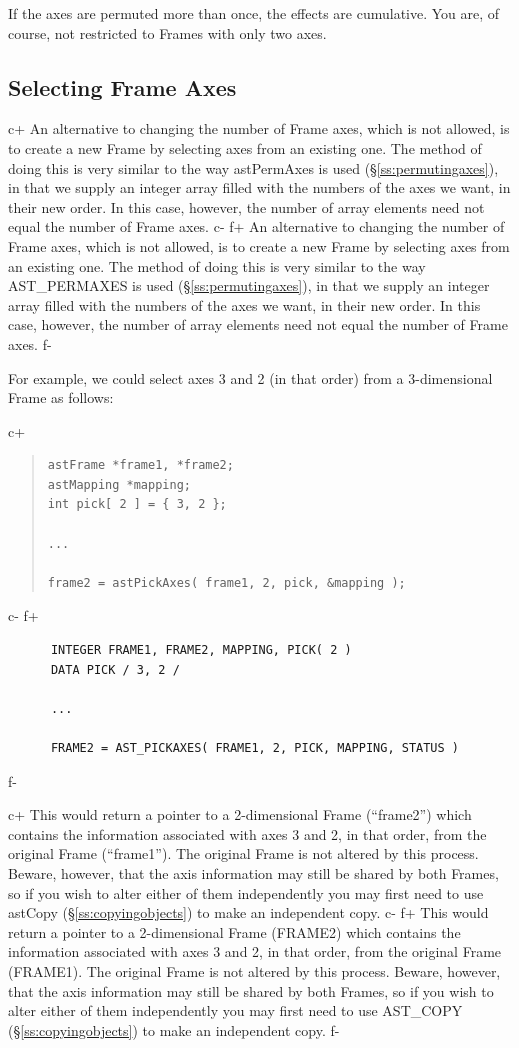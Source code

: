 \documentclass[twoside,11pt]{article}
\newcommand{\secref}[1]{\S\ref{#1}}
\newcommand{\secref}[1]{\ref{#1}}
\begin{document}
If the axes are permuted more than once, the effects are cumulative.
You are, of course, not restricted to Frames with only two axes.

\subsection{Selecting Frame Axes}

c+
An alternative to changing the number of Frame axes, which is not
allowed, is to create a new Frame by selecting axes from an existing
one. The method of doing this is very similar to the way astPermAxes
is used (\secref{ss:permutingaxes}), in that we supply an integer
array filled with the numbers of the axes we want, in their new
order. In this case, however, the number of array elements need not
equal the number of Frame axes.
c-
f+
An alternative to changing the number of Frame axes, which is not
allowed, is to create a new Frame by selecting axes from an existing
one. The method of doing this is very similar to the way AST\_PERMAXES
is used (\secref{ss:permutingaxes}), in that we supply an integer
array filled with the numbers of the axes we want, in their new
order. In this case, however, the number of array elements need not
equal the number of Frame axes.
f-

For example, we could select axes 3 and 2 (in that order) from a
3-dimensional Frame as follows:

c+
\begin{quote}
\small
\begin{verbatim}
astFrame *frame1, *frame2;
astMapping *mapping;
int pick[ 2 ] = { 3, 2 };

...

frame2 = astPickAxes( frame1, 2, pick, &mapping );
\end{verbatim}
\normalsize
\end{quote}
c-
f+
\small
\begin{verbatim}
      INTEGER FRAME1, FRAME2, MAPPING, PICK( 2 )
      DATA PICK / 3, 2 /

      ...

      FRAME2 = AST_PICKAXES( FRAME1, 2, PICK, MAPPING, STATUS )
\end{verbatim}
\normalsize
f-

c+
This would return a pointer to a 2-dimensional Frame (``frame2'')
which contains the information associated with axes 3 and 2, in that
order, from the original Frame (``frame1''). The original Frame is not
altered by this process. Beware, however, that the axis information
may still be shared by both Frames, so if you wish to alter either of
them independently you may first need to use astCopy
(\secref{ss:copyingobjects}) to make an independent copy.
c-
f+
This would return a pointer to a 2-dimensional Frame (FRAME2) which
contains the information associated with axes 3 and 2, in that order,
from the original Frame (FRAME1). The original Frame is not altered by
this process. Beware, however, that the axis information may still be
shared by both Frames, so if you wish to alter either of them
independently you may first need to use AST\_COPY
(\secref{ss:copyingobjects}) to make an independent copy.
f-
\end{document}
